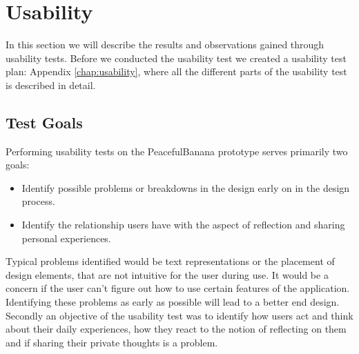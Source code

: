 
\chapter{Usability}
In this section we will describe the results and observations gained through usability tests. Before we conducted the usability test we created a usability test plan: Appendix \ref{chap:usability}, where all the different parts of the usability test is described in detail.
\section{Test Goals}
Performing usability tests on the PeacefulBanana prototype serves primarily two goals:
\begin{itemize}
\item Identify possible problems or breakdowns in the design\cite{ref:30} early on in the design process.
\item Identify the relationship users have with the aspect of reflection and sharing personal experiences.
\end{itemize}
Typical problems identified would be text representations or the placement of design elements, that are not intuitive for the user during use. It would be a concern if the user can't figure out how to use certain features of the application. Identifying these problems as early as possible will lead to a better end design. \\
Secondly an objective of the usability test was to identify how users act and think about their daily experiences, how they react to the notion of reflecting on them and if sharing their private thoughts is a problem. 


